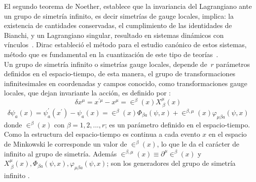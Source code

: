 \documentclass[a4paper,12pt]{article}
\begin{document}
El segundo teorema de Noether, establece que la invariancia del Lagrangiano ante un grupo de simetría infinito, es decir simetrías de gauge locales, implica: la existencia de cantidades conservadas, el cumplimiento de las identidades de Bianchi, y un Lagrangiano singular, resultado en sistemas dinámicos con \mbox{vínculos \cite{noether,vinculos, emmy, local}.} Dirac estableció el método para el estudio canónico de estos sistemas, método que es fundamental en la cuantización de este tipo de \mbox{teorías \cite{dirac, canoalor}.}
\\

Un grupo de simetría infinito o simetrías gauge locales, depende \mbox{de $r$} \mbox{parámetros} definidos en el espacio-tiempo, de esta manera, el grupo de \mbox{transformaciones} infinitesimales en coordenadas y campos conocido, como \mbox{transformaciones} gauge locales, que dejan invariante la acción, es definido por \cite{vinculos}:
\begin{equation}
\delta x^{\mu}=x^{'\mu}-x^{\mu}=\in^\beta(x) X_{\ \beta}^\mu(x)
\label{galoca}
\end{equation}
$$\delta\psi_a(x)=\psi_a^{'}(x^{'})-\psi_a(x)=\in^\beta(x)\Phi_{\beta a}(\psi,x)+\in^{\beta,\mu}(x)\varphi_{\mu\beta a}(\psi,x)$$
donde \mbox{$\in^\beta(x)$} con $\beta=1,2,...,r$; es un parámetro definido en el espacio-tiempo. Como la estructura del espacio-tiempo es continua a cada evento $x$ en el espacio de Minkowski le corresponde un valor de $\in^\beta(x)$, lo que le da el carácter de infinito al grupo de simetría. Además $\in^{\beta,\mu}(x)\equiv\partial^\mu\in^{\beta}(x)$ y $X_{\ \beta}^\mu(x), \Phi_{\beta a}(\psi,x), \varphi_{\mu\beta  a}(\psi,x)$; son los generadores del grupo de simetría infinito \cite{noether,vinculos,emmy,local}.    
\\
\end{document}
